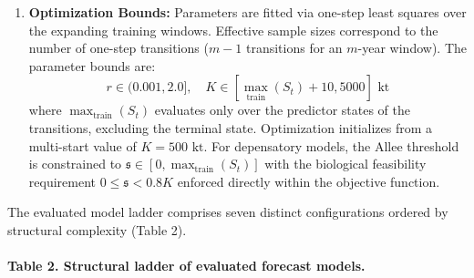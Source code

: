 \documentclass[11pt]{article}
\providecommand{\tightlist}{\setlength{\itemsep}{0.2em}\setlength{\parskip}{0pt}}
\begin{document}
\begin{enumerate}
  \begin{itemize}
  \tightlist
  \item
    \emph{Coarse Catch Regime:} Derived from DFO (2016) narratives,
    setting \(C_t = 240\text{ kt}\) for \(t \le 1991\),
    \(C_t = 120\text{ kt}\) for \(t = 1992\), and \(C_t = 5\text{ kt}\)
    for \(t \ge 1993\).
  \item
    \emph{Annual Landings Series:} Reconstructed historical landings
    from Schijns et al.~(2021, Table 1). For 1983--1993, this series
    matches official STATLANT records and Regular et al.~(2025) exactly
    (11-year absolute difference \(= 0\text{ t}\)). Landings dropped to
    \(41\text{ kt}\) in 1992, \(11\text{ kt}\) in 1993,
    \(1.31\text{ kt}\) in 1994, and \(0.41\text{ kt}\) in 1995.
  \end{itemize}
\item
  \textbf{Optimization Bounds:} Parameters are fitted via one-step least
  squares over the expanding training windows. Effective sample sizes
  correspond to the number of one-step transitions (\(m-1\) transitions
  for an \(m\)-year window). The parameter bounds are:
  \[r \in (0.001, 2.0], \quad K \in [\max_{\mathrm{train}}(S_t) + 10, 5000]\text{ kt}\]
  where \(\max_{\mathrm{train}}(S_t)\) evaluates only over the predictor
  states of the transitions, excluding the terminal state. Optimization
  initializes from a multi-start value of \(K = 500\text{ kt}\). For
  depensatory models, the Allee threshold is constrained to
  \(\mathfrak{s} \in [0, \max_{\mathrm{train}}(S_t)]\) with the
  biological feasibility requirement \(0 \le \mathfrak{s} < 0.8K\)
  enforced directly within the objective function.
\end{enumerate}

The evaluated model ladder comprises seven distinct configurations
ordered by structural complexity (Table 2).

\paragraph{Table 2. Structural ladder of evaluated forecast
models.}\label{table-2.-structural-ladder-of-evaluated-forecast-models.}
\end{document}
